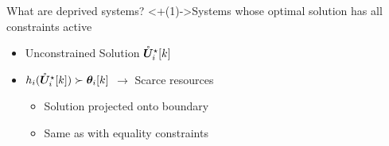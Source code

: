 \documentclass[handout,aspectratio=169]{beamer}
\begin{document}
\begin{frame}{What are deprived systems?}{}
  \centering
  \onslide<+(1)->{Systems whose optimal solution has all constraints active}

  \begin{minipage}[t]{.55\linewidth}
    \begin{itemize}[<+(2)->]
      \item Unconstrained Solution $\mathring{\boldsymbol{U}}^{\star}_i[k]$
      \item $h_{i}(\optuncUik) \succ\thetaik$ $\to$ Scarce resources
            \begin{itemize}
              \item Solution projected onto boundary
              \item Same as with equality constraints\footnotemark

            \end{itemize}
    \end{itemize}


\end{minipage}
\end{frame}
\end{document}
